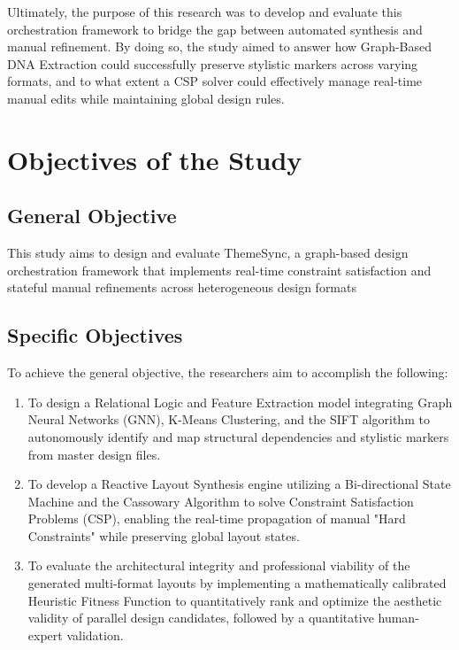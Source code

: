 \begin{refsection}
Ultimately, the purpose of this research was to develop and evaluate this orchestration framework to bridge the gap between automated synthesis and manual refinement. By doing so, the study aimed to answer how Graph-Based DNA Extraction could successfully preserve stylistic markers across varying formats, and to what extent a CSP solver could effectively manage real-time manual edits while maintaining global design rules.


\section{Objectives of the Study}

\subsection{General Objective}

This study aims to design and evaluate ThemeSync, a graph-based design orchestration framework that implements real-time constraint satisfaction and stateful manual refinements across heterogeneous design formats

\subsection{Specific Objectives}

To achieve the general objective, the researchers aim to accomplish the following:

\begin{enumerate}
    \item To design a Relational Logic and Feature Extraction model integrating Graph Neural Networks (GNN), K-Means Clustering, and the SIFT algorithm to autonomously identify and map structural dependencies and stylistic markers from master design files.
    \item To develop a Reactive Layout Synthesis engine utilizing a Bi-directional State Machine and the Cassowary Algorithm to solve Constraint Satisfaction Problems (CSP), enabling the real-time propagation of manual "Hard Constraints" while preserving global layout states.
    \item To evaluate the architectural integrity and professional viability of the generated multi-format layouts by implementing a mathematically calibrated Heuristic Fitness Function to quantitatively rank and optimize the aesthetic validity of parallel design candidates, followed by a quantitative human-expert validation.
\end{enumerate}
   


\end{refsection}
